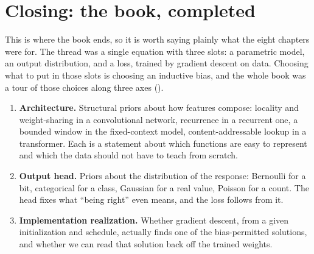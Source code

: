 
\section{Closing: the book, completed}\label{sec:book-close}

This is where the book ends, so it is worth saying plainly what the eight
chapters were for. The thread was a single equation with three slots: a
parametric model, an output distribution, and a loss, trained by gradient
descent on data. Choosing what to put in those slots is choosing an inductive
bias, and the whole book was a tour of those choices along three axes
().

\begin{enumerate}
\item \textbf{Architecture.} Structural priors about how features compose:
locality and weight-sharing in a convolutional network, recurrence in a
recurrent one, a bounded window in the fixed-context model, content-addressable
lookup in a transformer. Each is a statement about which functions are easy to
represent and which the data should not have to teach from scratch.
\item \textbf{Output head.} Priors about the distribution of the response:
Bernoulli for a bit, categorical for a class, Gaussian for a real value,
Poisson for a count. The head fixes what ``being right'' even means, and the
loss follows from it.
\item \textbf{Implementation realization.} Whether gradient descent, from a
given initialization and schedule, actually finds one of the bias-permitted
solutions, and whether we can read that solution back off the trained weights.
\end{enumerate}

